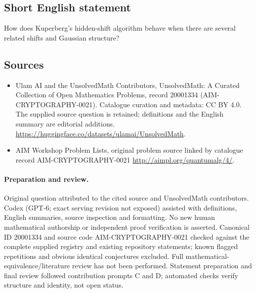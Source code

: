 \documentclass[11pt]{article}
\begin{document}
\subsection{Short English statement}
How does Kuperberg's hidden-shift algorithm behave when there are several related shifts and Gaussian structure?
\subsection{Sources}
\begin{itemize}
\item[\hypertarget{source:20001334:1}{S1}] Ulam AI and the UnsolvedMath Contributors, UnsolvedMath: A Curated Collection of Open Mathematics Problems, record 20001334 (AIM-CRYPTOGRAPHY-0021). Catalogue curation and metadata: CC BY 4.0. The supplied source question is retained; definitions and the English summary are editorial additions.
\url{https://huggingface.co/datasets/ulamai/UnsolvedMath}.
\item[\hypertarget{source:20001334:2}{S2}] AIM Workshop Problem Lists, original problem source linked by catalogue record AIM-CRYPTOGRAPHY-0021
\url{http://aimpl.org/quantumalg/4/}.
\end{itemize}
\paragraph{Preparation and review.}
Original question attributed to the cited source and UnsolvedMath contributors. Codex (GPT-6; exact serving revision not exposed) assisted with definitions, English summaries, source inspection and formatting. No new human mathematical authorship or independent proof verification is asserted. Canonical ID 20001334 and source code AIM-CRYPTOGRAPHY-0021 checked against the complete supplied registry and existing repository statements; known flagged repetitions and obvious identical conjectures excluded. Full mathematical-equivalence/literature review has not been performed. Statement preparation and final review followed contribution prompts C and D; automated checks verify structure and identity, not open status.
\label{end:20001334}
\end{document}
